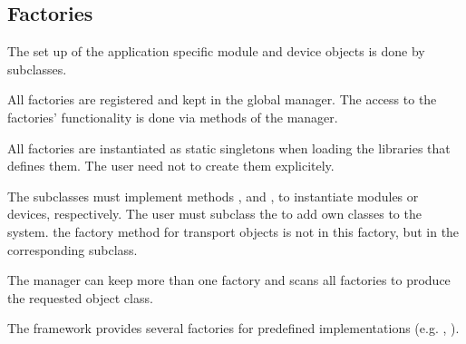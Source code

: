 \subsection{Factories}
The set up of the application specific module and device objects is done 
   by  subclasses.
\begin{compactitem}[$\circ$]
\item  All factories are registered and kept in the global manager. 
      The access to the factories' functionality is done via methods of the manager. 
\item  All factories are instantiated as static singletons when 
      loading the libraries that defines them. 
      The user need not to create them explicitely.       
\item  The  subclasses must implement methods , 
      and  , to instantiate modules or 
      devices, respectively. The user must subclass 
      the  to add own classes to the system.  the factory 
      method for transport objects is not in this factory, but in the 
      corresponding  subclass. 
\item  The manager can keep more than one factory and scans 
      all factories to produce the requested object class. 
\item  The framework provides several factories for predefined 
      implementations (e.g. , ).      
\end{compactitem}
